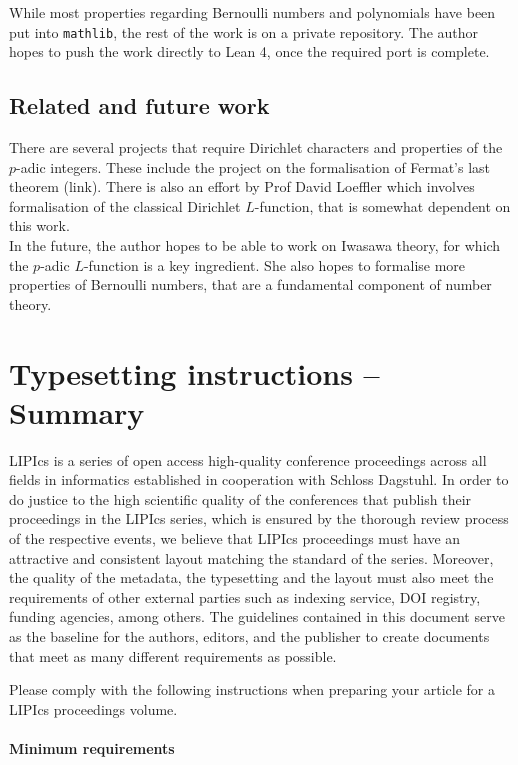 \documentclass[a4paper,UKenglish,cleveref, autoref, thm-restate]{lipics-v2021}
\newcommand{\lean}[1]{\texttt{#1}\xspace} %
\begin{document}
While most properties regarding Bernoulli numbers and polynomials have been put into \lean{mathlib}, the rest of the work is on a private repository. The author hopes to push the 
work directly to Lean 4, once the required port is complete.

\subsection{Related and future work} %
There are several projects that require Dirichlet characters and properties of the $p$-adic integers. These include the project on the formalisation of Fermat's last theorem (link). 
There is also an effort by Prof David Loeffler which involves formalisation of the classical Dirichlet $L$-function, that is somewhat dependent on this work. \\

In the future, the author hopes to be able to work on Iwasawa theory, for which the $p$-adic $L$-function is a key ingredient. She also hopes to formalise more properties of Bernoulli numbers, 
that are a fundamental component of number theory.



\section{Typesetting instructions -- Summary}
\label{sec:typesetting-summary}

LIPIcs is a series of open access high-quality conference proceedings across all fields in informatics established in cooperation with Schloss Dagstuhl. 
In order to do justice to the high scientific quality of the conferences that publish their proceedings in the LIPIcs series, which is ensured by the thorough review process of the respective events, we believe that LIPIcs proceedings must have an attractive and consistent layout matching the standard of the series.
Moreover, the quality of the metadata, the typesetting and the layout must also meet the requirements of other external parties such as indexing service, DOI registry, funding agencies, among others. The guidelines contained in this document serve as the baseline for the authors, editors, and the publisher to create documents that meet as many different requirements as possible. 

Please comply with the following instructions when preparing your article for a LIPIcs proceedings volume. 
\paragraph*{Minimum requirements}
\end{document}

